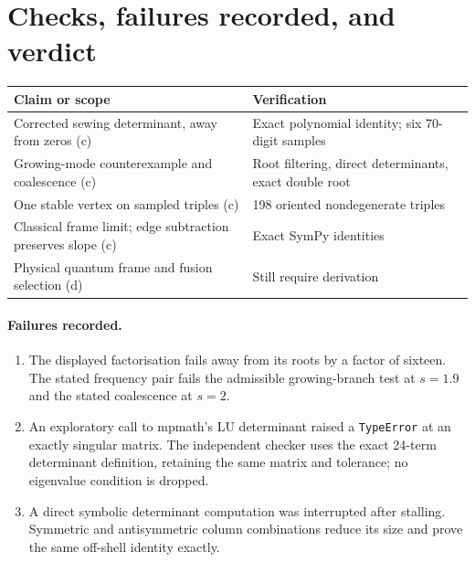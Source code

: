 \documentclass[11pt,a4paper]{article}
\begin{document}
\section{Checks, failures recorded, and verdict}
\begin{center}\small
\begin{tabular}{p{}p{}}\toprule
Claim or scope & Verification\\\midrule
Corrected sewing determinant, away from zeros (c) & Exact polynomial identity;
six 70-digit samples\\
Growing-mode counterexample and coalescence (c) & Root filtering, direct
determinants, exact double root\\
One stable vertex on sampled triples (c) & 198 oriented nondegenerate triples\\
Classical frame limit; edge subtraction preserves slope (c) & Exact SymPy identities\\
Physical quantum frame and fusion selection (d) & Still require derivation\\\bottomrule
\end{tabular}
\end{center}

\paragraph{Failures recorded.}
\begin{enumerate}
\item The displayed factorisation fails away from its roots by a factor
of sixteen. The stated frequency pair fails the admissible growing-branch
test at $s=1.9$ and the stated coalescence at $s=2$.
\item An exploratory call to mpmath's LU determinant raised a
\texttt{TypeError} at an exactly singular matrix. The independent checker
uses the exact 24-term determinant definition, retaining the same matrix
and tolerance; no eigenvalue condition is dropped.
\item A direct symbolic determinant computation was interrupted after
stalling. Symmetric and antisymmetric column combinations reduce its size
and prove the same off-shell identity exactly.
\end{enumerate}
\end{document}
